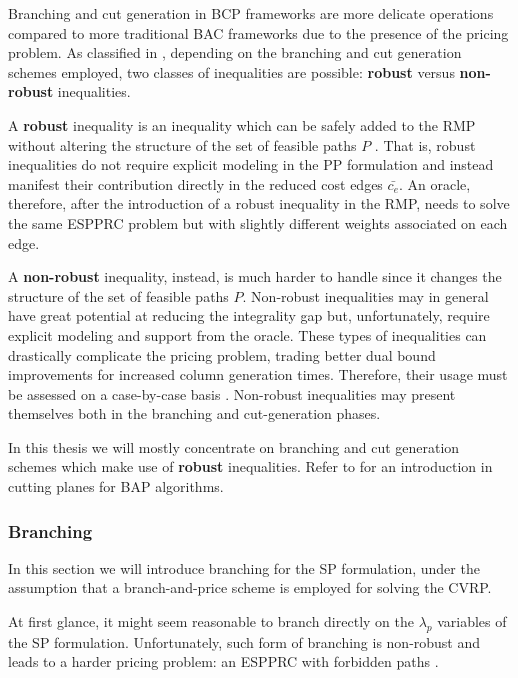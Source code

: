 Branching and cut generation in BCP frameworks are more delicate operations
compared to more traditional BAC frameworks due to the presence of the pricing problem.
As classified in \textcite{dearagao2003},
depending on the branching and cut generation schemes employed,
two classes of inequalities are possible:
\textbf{robust} versus \textbf{non-robust} inequalities.

A \textbf{robust} inequality is an inequality
which can be safely added to the RMP
without altering the structure of the set of feasible paths $P$ \parencite{fukasawa2006}.
That is,
robust inequalities do not require explicit modeling in the PP formulation
and instead manifest their contribution directly in the reduced cost edges $\bar{c_e}$.
An oracle, therefore,
after the introduction of a robust inequality in the RMP,
needs to solve the same ESPPRC problem but with slightly different weights associated on each edge.

A \textbf{non-robust} inequality, instead,
is much harder to handle since it changes the structure of the set of feasible paths $P$.
Non-robust inequalities may in general have great potential at reducing the integrality gap
but,
unfortunately, require explicit modeling and support from the oracle.
These types of inequalities can drastically complicate the pricing problem,
trading better dual bound improvements for increased column generation times.
Therefore, their usage must be assessed on a case-by-case basis \parencite{desaulniers2011}.
Non-robust inequalities may present themselves both in the branching and cut-generation phases.

In this thesis
we will mostly concentrate on branching and cut generation schemes
which make use of \textbf{robust} inequalities.
Refer to \textcite{desaulniers2011} for an introduction in cutting planes for BAP algorithms.


\subsubsection{Branching}
\label{sec:bap-branching}

In this section we will introduce branching for the SP formulation,
under the assumption that a branch-and-price scheme is employed
for solving the CVRP.

At first glance,
it might seem reasonable to branch directly on the $\lambda_p$ variables of the SP formulation.
Unfortunately, such form of branching is non-robust
and leads to a harder pricing problem: an ESPPRC with forbidden paths \parencite{villeneuve2005}.

